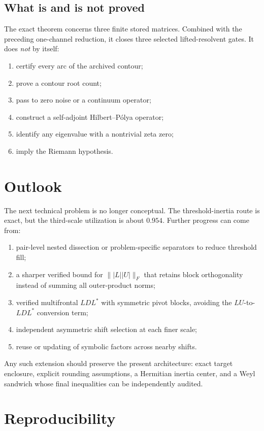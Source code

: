 \documentclass[11pt]{article}
\theoremstyle{definition}
\theoremstyle{remark}
\begin{document}
\subsection{What is and is not proved}

The exact theorem concerns three finite stored matrices.  Combined with the
preceding one-channel reduction, it closes three selected lifted-resolvent
gates.  It does \emph{not} by itself:
\begin{enumerate}
 \item certify every arc of the archived contour;
 \item prove a contour root count;
 \item pass to zero noise or a continuum operator;
 \item construct a self-adjoint Hilbert--P\'olya operator;
 \item identify any eigenvalue with a nontrivial zeta zero;
 \item imply the Riemann hypothesis.
\end{enumerate}


\section{Outlook}
\label{sec:outlook}

The next technical problem is no longer conceptual.  The threshold-inertia
route is exact, but the third-scale utilization is about $0.954$.  Further
progress can come from:
\begin{enumerate}
 \item pair-level nested dissection or problem-specific separators to reduce
       threshold fill;
 \item a sharper verified bound for $\||L||U|\|_F$ that retains block
       orthogonality instead of summing all outer-product norms;
 \item verified multifrontal $LDL^*$ with symmetric pivot blocks, avoiding
       the $LU$-to-$LDL^*$ conversion term;
 \item independent asymmetric shift selection at each finer scale;
 \item reuse or updating of symbolic factors across nearby shifts.
\end{enumerate}
Any such extension should preserve the present architecture: exact target
enclosure, explicit rounding assumptions, a Hermitian inertia center, and a
Weyl sandwich whose final inequalities can be independently audited.


\section*{Reproducibility}
\end{document}
